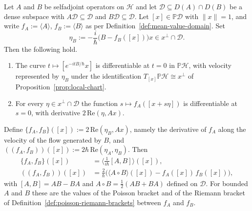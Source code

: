 \begin{lemma}\label{lem:pointwise-formulas}
	Let $A$ and $B$ be selfadjoint operators on $\mathcal{H}$ and let $\mathcal{D}\subseteq D(A)\cap D(B)$ be a dense subspace with $A\mathcal{D}\subseteq\mathcal{D}$ and $B\mathcal{D}\subseteq\mathcal{D}$. Let $[x]\in\mathbb{P}\mathcal{D}$ with $\|x\|=1$, and write $f_A:=\langle A\rangle$, $f_B:=\langle B\rangle$ as per Definition~\ref{def:mean-value-domain}. Set
	\begin{equation}
		\eta_B := -\frac{i}{\hbar}\big(B-f_B([x])\big)x \in x^\perp\cap\mathcal{D}.
	\end{equation}
	Then the following hold.
	\begin{enumerate}
		\item The curve $t\mapsto[e^{-itB/\hbar}x]$ is differentiable at $t=0$ in $\mathbb{P}\mathcal{H}$, with velocity represented by $\eta_B$ under the identification $T_{[x]}\mathbb{P}\mathcal{H}\cong x^\perp$ of Proposition~\ref{prop:local-chart}.
		\item For every $\eta\in x^\perp\cap\mathcal{D}$ the function $s\mapsto f_A([x+s\eta])$ is differentiable at $s=0$, with derivative $2\,\mathrm{Re}(\eta,Ax)$.
	\end{enumerate}
	Define $\{f_A,f_B\}([x]):=2\,\mathrm{Re}(\eta_B,Ax)$, namely the derivative of $f_A$ along the velocity of the flow generated by $B$, and $((f_A,f_B))([x]):=2\hbar\,\mathrm{Re}(\eta_A,\eta_B)$. Then
	\begin{align}
		\{f_A,f_B\}([x]) &= \Big\langle\frac{1}{i\hbar}[A,B]\Big\rangle([x]), \label{eq:pointwise-poisson}\\
		((f_A,f_B))([x]) &= \frac{2}{\hbar}\Big(\langle A\circ B\rangle([x])-f_A([x])\,f_B([x])\Big), \label{eq:pointwise-riemann}
	\end{align}
	with $[A,B]=AB-BA$ and $A\circ B=\tfrac{1}{2}(AB+BA)$ defined on $\mathcal{D}$. For bounded $A$ and $B$ these are the values of the Poisson bracket and of the Riemann bracket of Definition~\ref{def:poisson-riemann-brackets} between $f_A$ and $f_B$.
\end{lemma}

